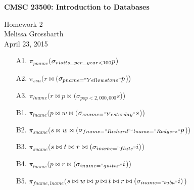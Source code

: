 \documentclass{article}[12pt]
\newcommand{\assignment}{Homework 2}
\newcommand{\whoami}{Melissa Grossbarth}
\newcommand{\assignmentdate}{April 23, 2015}
\newcommand{\rel}[1]{\ensuremath{#1}}
\newcommand{\nj}[2]{\ensuremath{#1 \bowtie #2}}
\newcommand{\sel}[2]{\ensuremath{\sigma_{#1} #2}}
\newcommand{\proj}[2]{\ensuremath{\pi_{#1} #2}}
\begin{document}
{\large \bf CMSC 23500: Introduction to Databases}

\assignment \\
\whoami \\
\assignmentdate

\hrulefill


\begin{enumerate}

\item[A1.] \proj{pname} (\sel{visits\char`_per\char`_year<100}{\rel{p}})

\item[A2.] \proj{ssn} (\nj{\rel{r}}({\sel{pname="Yellowstone"}{\rel{p}}}))

\item[A3.] \proj{lname} (\nj {\nj{\rel{r}}{\rel{p}}}({\sel{pop<2,000,000}{ \rel{s}}}))

\item[B1.] \proj{lname} (\nj{\nj{\rel{p}}{\rel{w}}}({\sel{sname="Yesterday"}{\rel{s}}}))

\item[B2.] \proj{sname} (\nj{\nj{\rel{s}}{\rel{w}}}({\sel{fname="Richard" \char`^ lname="Rodgers"}{\rel{p}}}))

\item[B3.] \proj{sname} (\nj{\rel{s}}{\nj{\nj{\rel{t}}{\rel{r}}}({\sel{iname="flute"}{\rel{i}}})})

\item[B4.] \proj{lname} (\nj{\nj{\rel{p}}{\rel{r}}}({\sel{iname="guitar"}{\rel{i}}}))

\item[B5.] \proj{fname,lname} (\nj{\rel{s}}{\nj{\rel{w}}{\nj{\rel{p}}{\nj{\rel{t}}{\nj{\rel{r}}{({\sel{iname="tuba"}{\rel{i}}})}}}}})

\end{enumerate}
\end{document}
